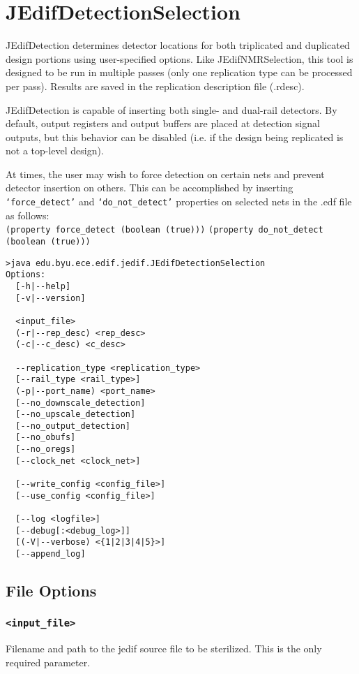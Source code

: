 \section{JEdifDetectionSelection}
JEdifDetection determines detector locations for both triplicated and
duplicated design portions using user-specified options. Like
JEdifNMRSelection, this tool is designed to be run in multiple passes
(only one replication type can be processed per pass). Results are
saved in the replication description file (.rdesc).

JEdifDetection is capable of inserting both single- and dual-rail detectors. By
default, output registers and output buffers are placed at detection signal
outputs, but this behavior can be disabled (i.e. if the design being replicated
is not a top-level design).

At times, the user may wish to force detection on certain nets and prevent
detector insertion on others. This can be accomplished by inserting
\texttt{`force\_detect'} and \texttt{`do\_not\_detect'} properties on selected
nets in the .edf file as follows:\\
\texttt{(property force\_detect (boolean (true)))}
\texttt{(property do\_not\_detect (boolean (true)))}\\

\begin{verbatim}
>java edu.byu.ece.edif.jedif.JEdifDetectionSelection
Options:
  [-h|--help]
  [-v|--version]

  <input_file>
  (-r|--rep_desc) <rep_desc>
  (-c|--c_desc) <c_desc>

  --replication_type <replication_type>
  [--rail_type <rail_type>]
  (-p|--port_name) <port_name>
  [--no_downscale_detection]
  [--no_upscale_detection]
  [--no_output_detection]
  [--no_obufs]
  [--no_oregs]
  [--clock_net <clock_net>]
 
  [--write_config <config_file>]
  [--use_config <config_file>]

  [--log <logfile>]
  [--debug[:<debug_log>]]
  [(-V|--verbose) <{1|2|3|4|5}>]
  [--append_log]
\end{verbatim}
\subsection{File Options}

\subsubsection{\texttt{<input\_file>}}
Filename and path to the jedif source file to be
sterilized. This is the only required parameter.

